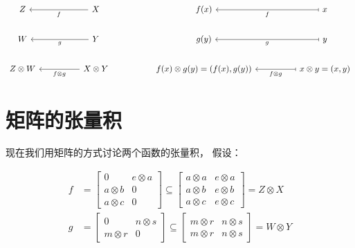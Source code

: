 \documentclass[10pt, openany]{book}
\begin{document}
$$
\begin{tikzcd}
Z           &  & X \arrow[ll, "f"]                     &  & f(x)                               &  & x \arrow[ll, "f", maps to]                               \\
W           &  & Y \arrow[ll, "g"]                     &  & g(y)                               &  & y \arrow[ll, "g", maps to]                               \\
Z \otimes W &  & X \otimes Y \arrow[ll, "f \otimes g"] &  & {f(x) \otimes g(y) = (f(x), g(y))} &  & {x \otimes y = (x,y)} \arrow[ll, "f \otimes g", maps to]
\end{tikzcd}
$$

\section{矩阵的张量积}

现在我们用矩阵的方式讨论两个函数的张量积，
假设：

$$
\begin{aligned}
f &= \begin{bmatrix}
0 & e \otimes a \\ 
a \otimes b & 0 \\ 
a \otimes c & 0
\end{bmatrix}
\subseteq \begin{bmatrix}
a \otimes a & e \otimes a \\ 
a \otimes b & e \otimes b \\ 
a \otimes c & e \otimes c
\end{bmatrix}
= Z \otimes X \\
g &= \begin{bmatrix}
0 & n \otimes s \\ 
m \otimes r & 0
\end{bmatrix}
\subseteq \begin{bmatrix}
m \otimes r & n \otimes s \\ 
m \otimes r & n \otimes s
\end{bmatrix}
= W \otimes Y
\end{aligned}
$$
\end{document}

